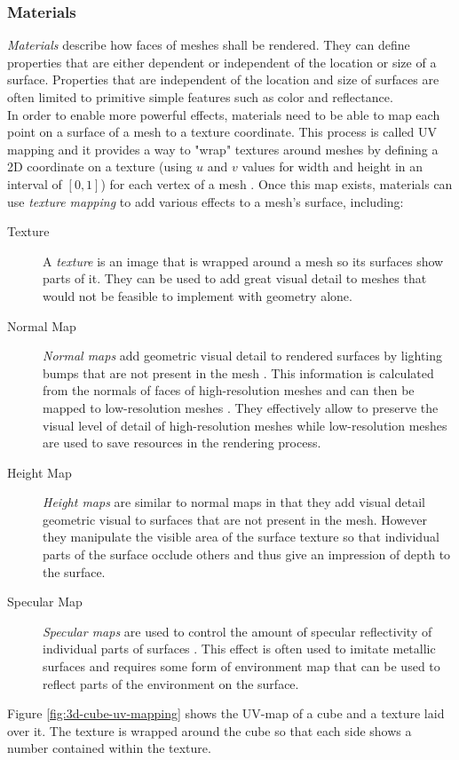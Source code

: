 \subsubsection{Materials}
\label{ch03-materials}
\emph{Materials} describe how faces of meshes shall be rendered. They can define properties that are either dependent or independent of the location or size of a surface. Properties that are independent of the location and size of surfaces are often limited to primitive simple features such as color and reflectance.\\
In order to enable more powerful effects, materials need to be able to map each point on a surface of a mesh to a texture coordinate. This process is called UV mapping and it provides a way to "wrap" textures around meshes by defining a 2D coordinate on a texture (using $u$ and $v$ values for width and height in an interval of $[0, 1]$) for each vertex of a mesh \cite{BlenderUVEditor}. Once this map exists, materials can use \emph{texture mapping} to add various effects to a mesh's surface, including:
\begin{description}
    \item[Texture] A \emph{texture} is an image that is wrapped around a mesh so its surfaces show parts of it. They can be used to add great visual detail to meshes that would not be feasible to implement with geometry alone.
    \item[Normal Map] \emph{Normal maps} add geometric visual detail to rendered surfaces by lighting bumps that are not present in the mesh \cite{UnityDocNormalmap}.  This information is calculated from the normals of faces of high-resolution meshes and can then be mapped to low-resolution meshes \cite{Cohen:1998:AS:280814.280832}\cite{745285}. They effectively allow to preserve the visual level of detail of high-resolution meshes while low-resolution meshes are used to save resources in the rendering process.
    \item[Height Map] \emph{Height maps} are similar to normal maps in that they add visual detail geometric visual to surfaces that are not present in the mesh. However they  manipulate the visible area of the surface texture so that individual parts of the surface occlude others and thus give an impression of depth to the surface.
    \item[Specular Map] \emph{Specular maps} are used to control the amount of specular reflectivity of individual parts of surfaces \cite{UnityDocSpecularmap}. This effect is often used to imitate metallic surfaces and requires some form of environment map that can be used to reflect parts of the environment on the surface.
\end{description}
Figure \ref{fig:3d-cube-uv-mapping} shows the UV-map of a cube and a texture laid over it. The texture is wrapped around the cube so that each side shows a number contained within the texture.

